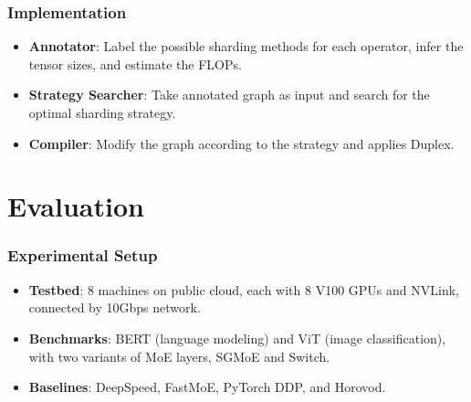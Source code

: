 \documentclass[12pt,aspectratio=169]{beamer}
\begin{document}
    \begin{frame}
        \frametitle{Implementation}

        \begin{itemize}
            \setlength{\itemsep}{.8em}
            \item \textbf{Annotator}: Label the possible sharding methods for each operator, infer the tensor sizes, and estimate the FLOPs.
            \item \textbf{Strategy Searcher}: Take annotated graph as input and search for the optimal sharding strategy.
            \item \textbf{Compiler}: Modify the graph according to the strategy and applies Duplex.
        \end{itemize}

    \end{frame}

    \section{Evaluation}

    \begin{frame}
        \frametitle{Experimental Setup}

        \begin{itemize}
            \setlength{\itemsep}{.8em}
            \item \textbf{Testbed}: 8 machines on public cloud, each with 8 V100 GPUs and NVLink, connected by 10Gbps network.
            \item \textbf{Benchmarks}: BERT (language modeling) and ViT (image classification), with two variants of MoE layers, SGMoE and Switch.
            \item \textbf{Baselines}: DeepSpeed, FastMoE, PyTorch DDP, and Horovod.
        \end{itemize}
    \end{frame}
\end{document}
